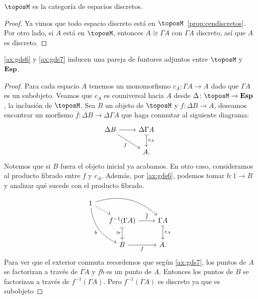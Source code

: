 \begin{theorem}
  $\toposM$ es la categoría de espacios discretos.
\end{theorem}
\begin{proof}
  Ya vimos que todo espacio discreto está en $\toposM$~\ref{prop:cendiscretos}. Por otro lado, 
  si $A$ está en $\toposM$, entonces $A\cong\Gamma A$ con $\Gamma A$ discreto, así que $A$ es discreto.
\end{proof}

\begin{theorem}[label=thm:funtordiscretos]
  \ref{ax:gds6} y \ref{ax:gds7} inducen una pareja de funtores adjuntos entre $\toposM$ y $\mathbf{Esp}$.
\end{theorem}
\begin{proof}
  Para cada espacio $A$ 
  tenemos un monomorfismo $c_A\colon  \Gamma A \to A$ dado
  que $\Gamma A$ es un subobjeto. Veamos que $c_A$ es couniversal hacia
  $A$ desde $\Delta\colon  \toposM \to \esp$, la inclusión de $\toposM$. Sea $B$ un
  objeto de $\toposM$ y $f\colon  \Delta B \to A$,
  deseamos encontrar un morfismo $\overline{f}\colon  \Delta B \to \Delta\Gamma A$ que haga conmutar al siguiente diagrama:
  \begin{equation*}
    \begin{tikzcd}
      \Delta B \ar{r} \ar[swap]{rd}{f} & \Delta\Gamma A \ar[tail]{d}{c_A} \\
        & A.
    \end{tikzcd}
  \end{equation*}
  Notemos que si $B$ fuera el objeto inicial ya acabamos. En otro caso, 
  consideramos al producto fibrado entre $f$ y $c_A$. Además, por \ref{ax:gds6}, podemos
  tomar $b\colon  1\to B$ y analizar qué sucede con el producto fibrado.
  \begin{equation*}
    \begin{tikzcd}
        1\ar[bend left=30]{rrd}\ar[bend right=30]{rdd}[swap]{b}
          \ar[dashed]{rd}{}\\[-2ex]
        &[-2ex] f^{-1} (\Gamma A)\ar{r}{\overline{f}} \ar[tail]{d}[swap]{\cong} & \Gamma A\ar[tail]{d}{c_A}\\
        & B\ar{r}[swap]{f} & A.
    \end{tikzcd}
  \end{equation*}
  Para ver que el exterior conmuta recordemos que según \ref{ax:gds7}, los puntos de $A$ se factorizan a
  través de $\Gamma A$ y $fb$ es un punto de $A$. Entonces los puntos de $B$ se factorizan
  a través de $f^{-1} (\Gamma A)$. Pero $f^{-1} (\Gamma A)$ es discreto ya que es subobjeto

\end{proof}
